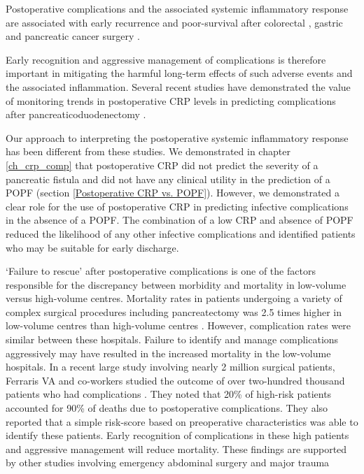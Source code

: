 Postoperative complications and the associated systemic inflammatory response are associated with early recurrence and poor-survival after colorectal \parencite{artinyan_infectious_2015, mcardle_impact_2005}, gastric \parencite{hayashi_impact_2015,kubota_prognostic_2014}  and pancreatic cancer surgery \parencite{aoyama_impact_2015, kamphues_postoperative_2012}.

Early recognition and aggressive management of complications is therefore important in mitigating the harmful long-term effects of such adverse events and the associated inflammation. 
Several recent studies have demonstrated the value of monitoring trends in postoperative CRP levels in predicting complications after pancreaticoduodenectomy \parencite{hiyoshi_usefulness_2013, ansorge_diagnostic_2014, kosaka_multivariate_2014}.

Our approach to interpreting the postoperative systemic inflammatory response has been different from these studies. 
We demonstrated in chapter \ref{ch_crp_comp} that postoperative CRP did not predict the severity of a pancreatic fistula and did not have any clinical utility in the prediction of a POPF (section \ref{Postoperative CRP vs. POPF}).
However, we demonstrated a clear role for the use of postoperative CRP in predicting infective complications in the absence of a POPF. 
The combination of a low CRP and absence of POPF reduced the likelihood of any other infective complications and identified patients who may be suitable for early discharge.

`Failure to rescue' after postoperative complications is one of the factors responsible for the discrepancy between morbidity and mortality in low-volume versus high-volume centres.
Mortality rates in patients undergoing a variety of complex surgical procedures including pancreatectomy was 2.5 times higher in low-volume centres than high-volume centres \parencite{ghaferi_complications_2009}.
However, complication rates were similar between these hospitals. 
Failure to identify and manage complications aggressively may have resulted in the increased mortality in the low-volume hospitals.
In a recent large study involving nearly 2 million surgical patients, Ferraris VA and co-workers studied the outcome of over two-hundred thousand patients who had complications \parencite{ferraris_va_identification_2014}. 
They noted that 20\% of high-risk patients accounted for 90\% of deaths due to postoperative complications. 
They also reported that a simple risk-score based on preoperative characteristics was able to identify these patients. 
Early recognition of complications in these high patients and aggressive management will reduce mortality.
These findings are supported by other studies involving emergency abdominal surgery \parencite{sheetz_improving_2013} and major trauma \parencite{haas_prevention_2011}

